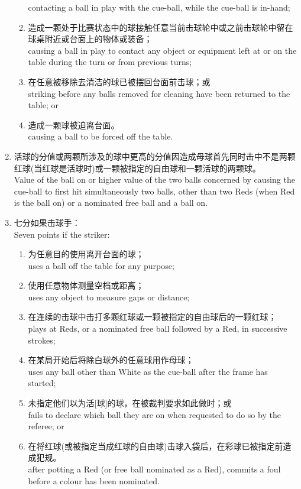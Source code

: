 \begin{enumerate}[label=(\alph*),start=1]
\begin{enumerate}[label=(\roman*)]
        contacting a ball in play with the cue-ball, while the cue-ball is in-hand;
        \item 造成一颗处于比赛状态中的球接触任意当前击球轮中或之前击球轮中留在球桌附近或台面上的物体或装备；\\
        causing a ball in play to contact any object or equipment left at or on the table during the turn or from previous turns;
        \item 在任意被移除去清洁的球已被摆回台面前击球；或\\
        striking before any balls removed for cleaning have been returned to the table; or
        \item 造成一颗球被迫离台面。\\
        causing a ball to be forced off the table.
    \end{enumerate}
    \item 活球的分值或两颗所涉及的球中更高的分值因造成母球首先同时击中不是两颗红球(当红球是活球时)或一颗被指定的自由球和一颗活球的两颗球。\\
    Value of the ball on or higher value of the two balls concerned by causing the cue-ball to first hit simultaneously two balls, other than two Reds (when Red is the ball on) or a nominated free ball and a ball on.
    \item \label{22311d}七分如果击球手：\\
    Seven points if the striker:
    \begin{enumerate}[label=(\roman*)]
        \item 为任意目的使用离开台面的球；\\
        uses a ball off the table for any purpose;
        \item 使用任意物体测量空档或距离；\\
        uses any object to measure gaps or distance;
        \item 在连续的击球中击打多颗红球或一颗被指定的自由球后的一颗红球；\\
        plays at Reds, or a nominated free ball followed by a Red, in successive strokes;
        \item 在某局开始后将除白球外的任意球用作母球；\\
        uses any ball other than White as the cue-ball after the frame has started;
        \item 未指定他们以为活[球]的球，在被裁判要求如此做时；或\\
        fails to declare which ball they are on when requested to do so by the referee; or
        \item 在将红球(或被指定当成红球的自由球)击球入袋后，在彩球已被指定前造成犯规。\\
        after potting a Red (or free ball nominated as a Red), commits a foul before a colour has been nominated.
    \end{enumerate}
\end{enumerate}
